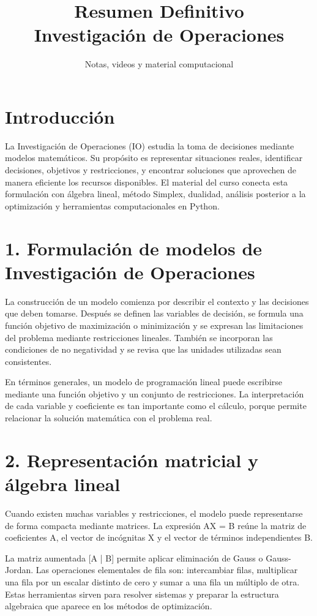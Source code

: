 \documentclass[11pt]{article}
\title{\textbf{Resumen Definitivo\\Investigación de Operaciones}}
\author{Notas, videos y material computacional}
\date{}
\begin{document}
\maketitle

\section*{Introducción}
La Investigación de Operaciones (IO) estudia la toma de decisiones mediante modelos matemáticos. Su propósito es representar situaciones reales, identificar decisiones, objetivos y restricciones, y encontrar soluciones que aprovechen de manera eficiente los recursos disponibles. El material del curso conecta esta formulación con álgebra lineal, método Simplex, dualidad, análisis posterior a la optimización y herramientas computacionales en Python.


\section*{1. Formulación de modelos de Investigación de Operaciones}
La construcción de un modelo comienza por describir el contexto y las decisiones que deben tomarse. Después se definen las variables de decisión, se formula una función objetivo de maximización o minimización y se expresan las limitaciones del problema mediante restricciones lineales. También se incorporan las condiciones de no negatividad y se revisa que las unidades utilizadas sean consistentes.

En términos generales, un modelo de programación lineal puede escribirse mediante una función objetivo y un conjunto de restricciones. La interpretación de cada variable y coeficiente es tan importante como el cálculo, porque permite relacionar la solución matemática con el problema real.


\section*{2. Representación matricial y álgebra lineal}
Cuando existen muchas variables y restricciones, el modelo puede representarse de forma compacta mediante matrices. La expresión AX = B reúne la matriz de coeficientes A, el vector de incógnitas X y el vector de términos independientes B.

La matriz aumentada [A | B] permite aplicar eliminación de Gauss o Gauss-Jordan. Las operaciones elementales de fila son: intercambiar filas, multiplicar una fila por un escalar distinto de cero y sumar a una fila un múltiplo de otra. Estas herramientas sirven para resolver sistemas y preparar la estructura algebraica que aparece en los métodos de optimización.
\end{document}
